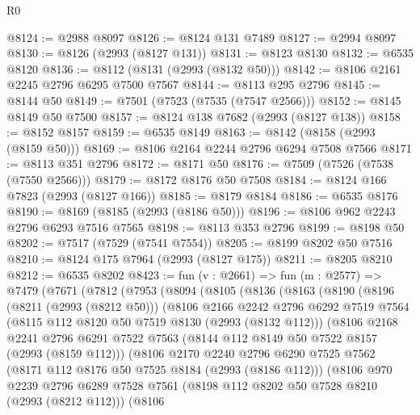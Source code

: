 \begin{lexlean}{R0}
\begin{coremodule}
@8124 := @2988 @8097
@8126 := @8124 @131 @7489
@8127 := @2994 @8097
@8130 := @8126 (@2993 (@8127 @131))
@8131 := @8123 @8130
@8132 := @6535 @8120
@8136 := @8112 (@8131 (@2993 (@8132 @50)))
@8142 := @8106 @2161 @2245 @2796 @6295 @7500 @7567
@8144 := @8113 @295 @2796
@8145 := @8144 @50
@8149 := @7501 (@7523 (@7535 (@7547 @2566)))
@8152 := @8145 @8149 @50 @7500
@8157 := @8124 @138 @7682 (@2993 (@8127 @138))
@8158 := @8152 @8157
@8159 := @6535 @8149
@8163 := @8142 (@8158 (@2993 (@8159 @50)))
@8169 := @8106 @2164 @2244 @2796 @6294 @7508 @7566
@8171 := @8113 @351 @2796
@8172 := @8171 @50
@8176 := @7509 (@7526 (@7538 (@7550 @2566)))
@8179 := @8172 @8176 @50 @7508
@8184 := @8124 @166 @7823 (@2993 (@8127 @166))
@8185 := @8179 @8184
@8186 := @6535 @8176
@8190 := @8169 (@8185 (@2993 (@8186 @50)))
@8196 := @8106 @962 @2243 @2796 @6293 @7516 @7565
@8198 := @8113 @353 @2796
@8199 := @8198 @50
@8202 := @7517 (@7529 (@7541 @7554))
@8205 := @8199 @8202 @50 @7516
@8210 := @8124 @175 @7964 (@2993 (@8127 @175))
@8211 := @8205 @8210
@8212 := @6535 @8202
@8423 := fun (v : @2661) =>
  fun (m : @2577) =>
  @7479
    (@7671
      (@7812
        (@7953
          (@8094
            (@8105
              (@8136
                (@8163
                  (@8190
                    (@8196
                      (@8211 (@2993 (@8212 @50)))
                      (@8106
                        @2166
                        @2242
                        @2796
                        @6292
                        @7519
                        @7564
                        (@8115 @112 @8120 @50 @7519 @8130 (@2993 (@8132 @112)))
                        (@8106
                          @2168
                          @2241
                          @2796
                          @6291
                          @7522
                          @7563
                          (@8144 @112 @8149 @50 @7522 @8157 (@2993 (@8159 @112)))
                          (@8106
                            @2170
                            @2240
                            @2796
                            @6290
                            @7525
                            @7562
                            (@8171 @112 @8176 @50 @7525 @8184 (@2993 (@8186 @112)))
                            (@8106
                              @970
                              @2239
                              @2796
                              @6289
                              @7528
                              @7561
                              (@8198 @112 @8202 @50 @7528 @8210 (@2993 (@8212 @112)))
                              (@8106

\end{coremodule}
\end{lexlean}
